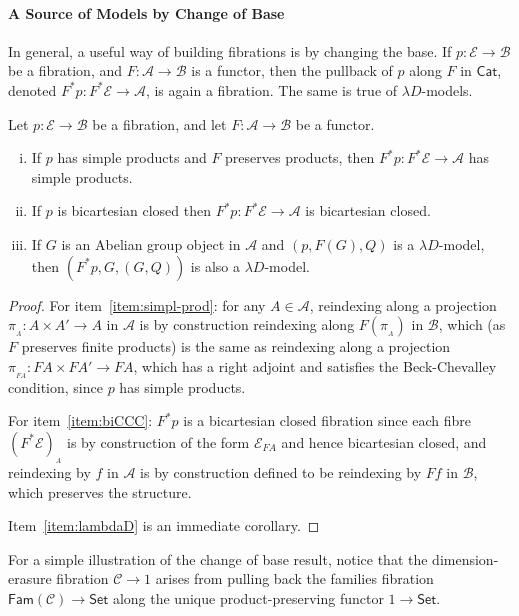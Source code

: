 \documentclass[a4paper,UKenglish]{lipics}
\newcommand{\ra}{\rightarrow}
\newcommand{\msf}[1]{\mathsf{#1}} %
\newcommand{\Set}{\msf{Set}}
\newcommand{\Cat}{\msf{Cat}}
\newcommand{\Fam}[1]{\msf{Fam}(#1)}
\newcommand{\A}{\mathcal{A}}
\newcommand{\B}{\mathcal{B}}
\newcommand{\C}{\mathcal{C}}
\newcommand{\E}{\mathcal{E}}
\newcommand{\fibre}[2]{#1_{_{#2}}}
\newcommand{\fibreE}[1]{\E_{#1}}
\begin{document}
\paragraph*{A Source of Models by Change of Base}
\label{sec:change-of-base}
In general, a useful way of building fibrations is by changing the base. If $p:\E\ra \B$ be a fibration, and $F:\A\ra \B$ is a functor, then the pullback of $p$ along $F$ in $\Cat$, denoted $F^\ast p : F^\ast \E \rightarrow \A$, is again a fibration. The same is true of $\lambda D$-models.
\begin{theorem}
\label{thm:change-of-base}
Let $p:\E\ra \B$ be a fibration, and let $F:\A\ra \B$ be a functor.
\begin{enumerate}[(i)]
\item If $p$ has simple products and $F$ preserves products,
then $F^\ast p : F^\ast \E \rightarrow \A$ has simple products.
\label{item:simpl-prod}
\item If $p$ is bicartesian closed then $F^\ast p: F^\ast \E \rightarrow \A$
is bicartesian closed.
\label{item:biCCC}
\item If $G$ is an Abelian group object in $\A$ and
  $(p,F(G),Q)$ is a $\lambda D$-model,
  then $(F^\ast p,G,(G, Q))$ is also a $\lambda D$-model.
\label{item:lambdaD}
\end{enumerate}
\end{theorem}
\begin{proof}
For item~\eqref{item:simpl-prod}: for any $A \in \A$, reindexing along a projection $\pi_{_{A}}: A \times A' \rightarrow A$ in $\A$ is by construction reindexing along $F(\pi_{_{A}})$ in $\B$, which (as $F$ preserves finite products) is the same as reindexing along a projection $\pi_{_{FA}} : FA \times FA' \rightarrow FA$, which has a right adjoint and satisfies the Beck-Chevalley condition, since $p$ has simple products.

For item~\eqref{item:biCCC}: $F^*p$ is a bicartesian closed fibration since each fibre $\fibre{(F^*\E)}{A}$ is by construction of the form $\fibreE{FA}$ and hence bicartesian closed, and reindexing by $f$ in $\A$ is by construction defined to be reindexing by $Ff$ in $\B$, which preserves the structure.

Item~\eqref{item:lambdaD} is an immediate corollary.
\end{proof}


For a simple illustration of the change of base result, notice that the dimension-erasure fibration $\C\to 1$ arises from pulling back the families fibration $\Fam\C\to\Set$ along the unique product-preserving functor $1\to\Set$.
\end{document}
